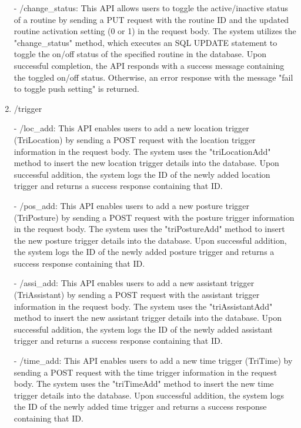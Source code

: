 \begin{enumerate}
    \item[-] /change\_status: This API allows users to toggle the active/inactive status of a routine by sending a PUT request with the routine ID and the updated routine activation setting (0 or 1) in the request body. The system utilizes the "change\_status" method, which executes an SQL UPDATE statement to toggle the on/off status of the specified routine in the database. Upon successful completion, the API responds with a success message containing the toggled on/off status. Otherwise, an error response with the message "fail to toggle push setting" is returned.\\

    \item /trigger
    \item[-] /loc\_add: This API enables users to add a new location trigger (TriLocation) by sending a POST request with the location trigger information in the request body. The system uses the "triLocationAdd" method to insert the new location trigger details into the database. Upon successful addition, the system logs the ID of the newly added location trigger and returns a success response containing that ID.\\
    \item[-] /pos\_add: This API enables users to add a new posture trigger (TriPosture) by sending a POST request with the posture trigger information in the request body. The system uses the "triPostureAdd" method to insert the new posture trigger details into the database. Upon successful addition, the system logs the ID of the newly added posture trigger and returns a success response containing that ID.\\
    \item[-] /assi\_add: This API enables users to add a new assistant trigger (TriAssistant) by sending a POST request with the assistant trigger information in the request body. The system uses the "triAssistantAdd" method to insert the new assistant trigger details into the database. Upon successful addition, the system logs the ID of the newly added assistant trigger and returns a success response containing that ID.\\
    \item[-] /time\_add: This API enables users to add a new time trigger (TriTime) by sending a POST request with the time trigger information in the request body. The system uses the "triTimeAdd" method to insert the new time trigger details into the database. Upon successful addition, the system logs the ID of the newly added time trigger and returns a success response containing that ID.\\

\end{enumerate}
